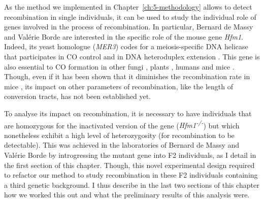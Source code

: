 \newpage



As the method we implemented in Chapter~\ref{ch:5-methodology} allows to detect recombination in single individuals, it can be used to study the individual role of genes involved in the process of recombination.
In particular, Bernard de Massy and Valérie Borde are interested in the specific role of the mouse gene \textit{Hfm1}.
Indeed, its yeast homologue (\textit{MER3}) codes for a meiosis-specific DNA helicase \citep{nakagawa1999saccharomyces,nakagawa2002saccharomyces} that participates in CO control and in DNA heteroduplex extension \citep{mazina2004saccharomyces,nakagawa2002mer3}.
This gene is also essential to CO formation in other fungi \citep{sugawara2009coprinus}, plants \citep{mercier2005two,chen2005arabidopsis}, humans \citep{tanaka2006hfm1} and mice \citep{guiraldelli2013mouse}.
Though, even if it has been shown that it diminishes the recombination rate in mice \citep{guiraldelli2013mouse}, its impact on other parameters of recombination, like the length of conversion tracts, has not been established yet.

To analyse its impact on recombination, it is necessary to have individuals that are homozygous for the inactivated version of the gene (\textit{Hfm1\textsuperscript{-/-}}) but which nonetheless exhibit a high level of heterozygosity (for recombination to be detectable).
This was achieved in the laboratories of Bernard de Massy and Valérie Borde by introgressing the mutant gene into F2 individuals, as I detail in the first section of this chapter.
Though, this novel experimental design required to refactor our method to study recombination in these F2 individuals containing a third genetic background. 
I thus describe in the last two sections of this chapter how we worked this out and what the preliminary results of this analysis were.

%
%
%


